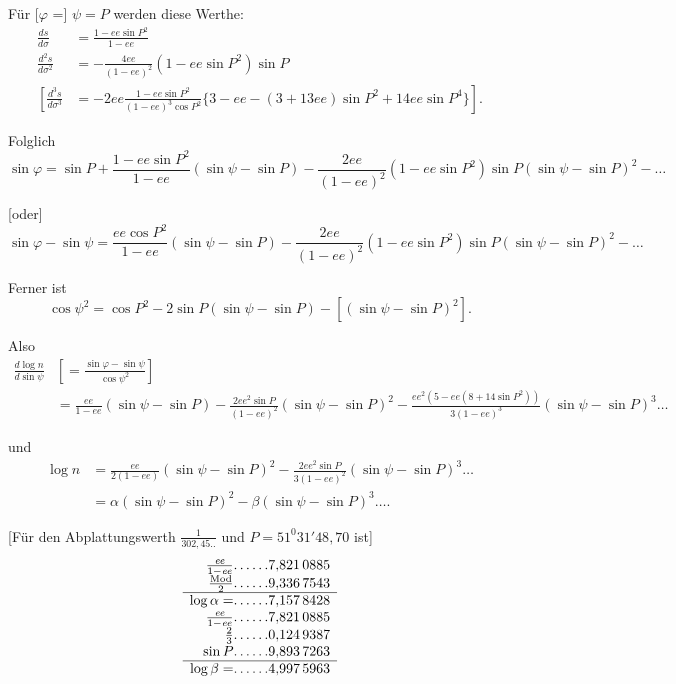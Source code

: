 \documentclass[12pt,a4paper]{article}
\theoremstyle{plain}
\theoremstyle{definition}
\theoremstyle{remark}
\newcommand{\ee}{\mathit{ee}}
\newcommand{\Mod}{\operatorname{Mod}}
\begin{document}
Für [$\varphi$ =] $\psi = P$ werden diese Werthe:
\[
\begin{aligned}
\frac{ds}{d\sigma} &= \frac{1 - \ee\sin P^2}{1 - \ee} \\
\frac{d^2s}{d\sigma^2} &= -\frac{4\ee}{(1 - \ee)^2}(1 - \ee\sin P^2)\sin P \\
\left[\frac{d^3s}{d\sigma^3}\right. &= \left. -2\ee\frac{1 - \ee\sin P^2}{(1 - \ee)^3\cos P^2}\{3 - \ee - (3 + 13\ee)\sin P^2 + 14\ee\sin P^4\}\right].
\end{aligned}
\]

Folglich
\[
\sin\varphi = \sin P + \frac{1 - \ee\sin P^2}{1 - \ee}(\sin\psi - \sin P) - \frac{2\ee}{(1 - \ee)^2}(1 - \ee\sin P^2)\sin P(\sin\psi - \sin P)^2 - \ldots
\]

[oder]
\[
\sin\varphi - \sin\psi = \frac{\ee\cos P^2}{1 - \ee}(\sin\psi - \sin P) - \frac{2\ee}{(1 - \ee)^2}(1 - \ee\sin P^2)\sin P(\sin\psi - \sin P)^2 - \ldots
\]

Ferner ist
\[
\cos\psi^2 = \cos P^2 - 2\sin P(\sin\psi - \sin P) - [(\sin\psi - \sin P)^2].
\]

Also
\[
\begin{aligned}
\frac{d\log n}{d\sin\psi} &\left[= \frac{\sin\varphi - \sin\psi}{\cos\psi^2}\right] \\
&= \frac{\ee}{1 - \ee}(\sin\psi - \sin P) - \frac{2\ee^2\sin P}{(1 - \ee)^2}(\sin\psi - \sin P)^2 - \frac{\ee^2(5 - \ee(8 + 14\sin P^2))}{3(1 - \ee)^3}(\sin\psi - \sin P)^3 \ldots
\end{aligned}
\]

und
\[
\begin{aligned}
\log n &= \frac{\ee}{2(1 - \ee)}(\sin\psi - \sin P)^2 - \frac{2\ee^2\sin P}{3(1 - \ee)^2}(\sin\psi - \sin P)^3 \ldots \\
&= \alpha(\sin\psi - \sin P)^2 - \beta(\sin\psi - \sin P)^3 \ldots.
\end{aligned}
\]

[Für den Abplattungswerth $\frac{1}{302{,}45..}$ und $P = 51^0 31' 48{,}70$ ist]
\[
\begin{array}{r@{\ldots\ldots}l}
\frac{\ee}{1 - \ee} & 7{,}821\,0885\\
\frac{\Mod}{2} & 9{,}336\,7543\\
\hline
\log\alpha = & 7{,}157\,8428\\
\frac{\ee}{1 - \ee} & 7{,}821\,0885\\
\frac{2}{3} & 0{,}124\,9387\\
\sin P & 9{,}893\,7263\\
\hline
\log\beta = & 4{,}997\,5963
\end{array}
\]
\end{document}
